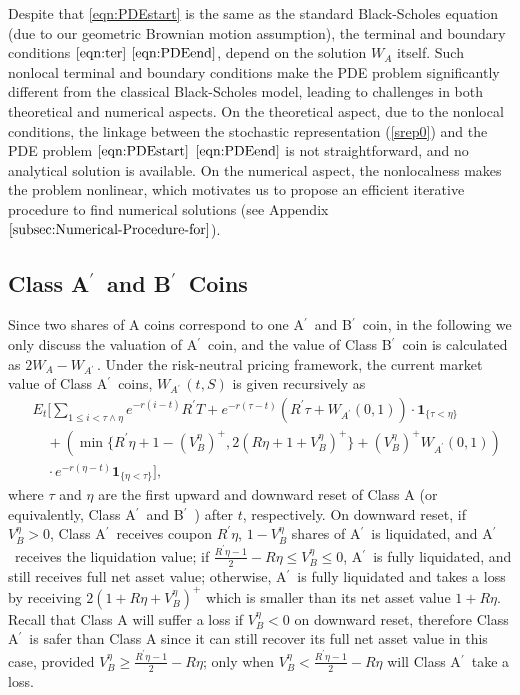 \documentclass[draft, noinfoline]{ectaart}
\numberwithin{equation}{section}
\theoremstyle{plain}
\newcommand{\Ap}{A\ensuremath{^\prime}~}
\newcommand{\Bp}{B\ensuremath{^\prime}~}
\begin{document}
 Despite that \eqref{eqn:PDEstart} is the same as the standard Black-Scholes equation (due to our geometric Brownian motion assumption), the terminal and boundary conditions $\eqref{eqn:ter}$ \textendash{} $\eqref{eqn:PDEend}$, depend on the solution $W_{A}$ itself. Such nonlocal terminal and boundary conditions make the PDE problem significantly different from the classical Black-Scholes model, leading to challenges in both theoretical and numerical aspects. On the theoretical aspect, due to the nonlocal conditions, the linkage between the stochastic representation (\ref{srep0}) and the PDE problem $\eqref{eqn:PDEstart}$ \textendash{} $\eqref{eqn:PDEend}$ is not straightforward, and no analytical solution is available. On the numerical aspect, the nonlocalness makes the problem nonlinear, which motivates us to propose an efficient iterative procedure to find numerical solutions (see Appendix $\ref{subsec:Numerical-Procedure-for}$).



\subsection{\texorpdfstring{Class \Ap and \Bp Coins}{Lg}}
Since two shares of A coins correspond to one \Ap and \Bp coin, in the following we only discuss the valuation of \Ap coin, and the value of Class \Bp coin is calculated as $2W_A-W_{\Ap}$. Under the risk-neutral pricing framework, the current market value of Class \Ap coins, $W_{\Ap}(t,S)$ is given recursively as
\begin{equation}    \label{VAL3}
\begin{split}
 &~ E_{t}\Bigg[\sum_{1\le i<\tau\land\eta}e^{-r(i-t)}R^\prime T+e^{-r(\tau-t)}(R^\prime\tau+W_{A^\prime}(0,1))\cdot\mathbf{1}_{\{\tau<\eta\}}
                       \\
 &~ \quad + \left(\min\{R^\prime\eta+1-(V_{B}^{\eta})^+,2(R\eta+1+V_B^{\eta})^+\}+(V_{B}^{\eta})^+W_{A^\prime}(0,1)\right) \\
  &~ \quad \cdot e^{-r(\eta-t)} \mathbf{1}_{\{\eta<\tau\}}\Bigg],
\end{split}
\end{equation}
where $\tau$ and $\eta$ are the first upward and downward reset of Class A (or equivalently, Class \Ap and \Bp) after $t$, respectively. On downward reset, if $V_B^{\eta}>0$, Class \Ap receives coupon $R^\prime\eta$, $1-V_B^{\eta}$ shares of \Ap is liquidated, and \Ap receives the liquidation value; if $\frac{R^\prime\eta-1}{2}-R\eta\le V_B^{\eta}\le 0$, \Ap is fully liquidated, and still receives full net asset value; otherwise, \Ap is fully liquidated and takes a loss by receiving $2(1+R\eta+V_B^{\eta})^+$ which is smaller than its net asset value $1+R\eta$. Recall that Class A will suffer a loss if $V_B^\eta<0$ on downward reset, therefore Class \Ap is safer than Class A since it can still recover its full net asset value in this case, provided $V_B^{\eta}\ge \frac{R^\prime\eta-1}{2}-R\eta$; only when $V_B^{\eta}< \frac{R^\prime\eta-1}{2}-R\eta$ will Class \Ap take a loss.
\end{document}
